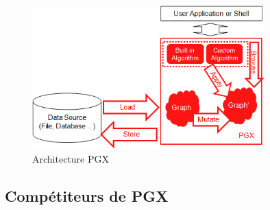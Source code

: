 \begin{figure}[h!]  
  \centering
    \includegraphics[width=0.8\textwidth]{chapitre1/Figures/pgx_overview.png}
  \caption{Architecture PGX}
\end{figure}

\subsection{Compétiteurs de PGX}

